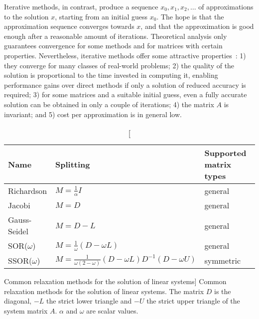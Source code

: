 Iterative methods, in contrast, produce a sequence $x_0, x_1, x_2, \ldots$ of
approximations to the solution $x$, starting from an initial guess $x_0$. The
hope is that the approximation sequence converges towards $x$, and that the
approximation is
good enough after a reasonable amount of iterations. Theoretical analysis only
guarantees convergence for some methods and for matrices with certain
properties. Nevertheless, iterative methods offer some attractive
properties~\cite{saad}: 1) they converge for many classes of real-world
problems; 2) the quality of the solution is proportional to the time
invested in computing it, enabling performance gains over direct methods if only
a solution of reduced accuracy is required; 3) for some matrices and a
suitable initial guess, even a fully accurate solution can be obtained in only a
couple of iterations; 4) the matrix $A$ is invariant; and 5) cost per
approximation is in general low.

\begin{table}[t]
\begin{center}
\begin{tabular}{lll}
Name & Splitting & Supported matrix types \\
\midrule
Richardson & 
    $M = \frac{1}{\alpha}I$ &
    general \\[1em]
Jacobi &
    $M = D$ &
    general \\[1em]
Gauss-Seidel &
    $M = D - L$ &
general \\[1em]
SOR($\omega$) &
    $M = \frac{1}{\omega}(D - \omega L)$ &
general \\[1em]
SSOR($\omega$) &
    $M = \frac{1}{\omega(2 - \omega)}(D - \omega L)D^{-1}(D - \omega U)$ &
symmetric \\[1em]
\end{tabular}
\end{center}
\caption
[Common relaxation methods for the solution of linear systems]
{Common relaxation methods for the solution of linear
systems. The matrix $D$ is the diagonal, $-L$ the strict lower triangle and $-U$
the strict upper triangle of the system matrix $A$. $\alpha$ and $\omega$ are
scalar values.}
\label{introduction:tab:relaxation-methods}
\end{table}

